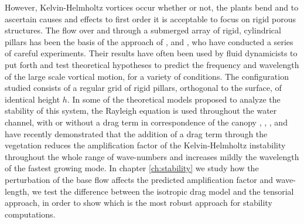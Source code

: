 However, Kelvin-Helmholtz vortices occur whether or not, the plants bend and to ascertain causes and effects to first order it is acceptable to focus on rigid porous structures.
The flow over and through a submerged array of rigid, cylindrical pillars has been the basis of the approach of \citet{ghisalberti2002mixing}, \citet{ghisalberti2004limited} and \citet{ghisalberti2005mass}, who have conducted a series of careful experiments. Their results have often been used by fluid dynamicists to put forth and test theoretical hypotheses to predict the frequency and wavelength of the large scale vortical motion, for a variety of conditions.
The configuration studied consists of a regular grid of rigid pillars, orthogonal to the surface, of identical height $h$.
In some of the theoretical models proposed to analyze the stability of this system, the Rayleigh equation is
used throughout the water channel, with or without a drag term in correspondence of the canopy \citet{raupach1996coherent}, \citet{py2004mixing}, \citet{singh2016linear}, \citet{zampogna2016instability} and \citet{luminari2016drag} have recently demonstrated that the addition of a drag term through the vegetation reduces the amplification factor of the Kelvin-Helmholtz instability throughout the whole range of wave-numbers and increases mildly the wavelength of the fastest growing mode.
In chapter \ref{ch:stability} we study how the perturbation of the base flow affects the predicted amplification factor and wave-length, we test the difference between the isotropic drag model and the tensorial approach, in order to show which is the most robust approach for stability computations.





